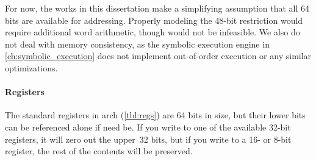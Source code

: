 For now, the works in this dissertation make a simplifying assumption that all 64 bits
are available for addressing. Properly modeling the 48-bit restriction would
require additional word arithmetic, though would not be infeasible.
We also do not deal with memory consistency, as the symbolic execution engine
in \cref{ch:symbolic_execution} does not implement out-of-order execution
or any similar optimizations.

\paragraph{Registers}\label{par:reg}
The standard registers in \gls{arch} (\cref{tbl:regs}) are 64 bits in size,
but their lower bits can be referenced alone if need be.
If you write to one of the available 32-bit registers,
it will zero out the upper~32 bits, but if you write to a 16- or 8-bit register,
the rest of the contents will be preserved.
